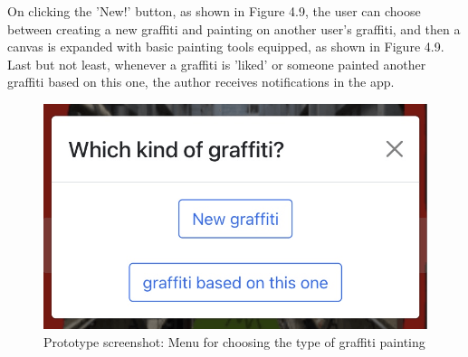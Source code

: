 On clicking the 'New!' button, as shown in Figure 4.9, the user can choose between creating a new graffiti and painting on another user's graffiti,
and then a canvas is expanded with basic painting tools equipped, as shown in Figure 4.9.
Last but not least, whenever a graffiti is 'liked' or someone painted another graffiti based on this one, the author receives notifications in the app.

\begin{figure}
  \begin{minipage}{0.48\textwidth}
    \centering
    \includegraphics[width=0.9\linewidth]{resources/4_methodology/prototype_choose_graffiti_type.png}
      \caption{Prototype screenshot: Menu for choosing the type of graffiti painting}
  \end{minipage}\hfill
  \begin{minipage}{0.48\textwidth}
    \centering

\end{minipage}
\end{figure}

